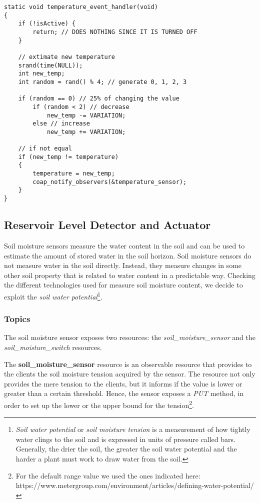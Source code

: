 \begin{lstlisting}
static void temperature_event_handler(void)
{
    if (!isActive) {
        return; // DOES NOTHING SINCE IT IS TURNED OFF
    }
    
    // extimate new temperature
    srand(time(NULL));
    int new_temp;
    int random = rand() % 4; // generate 0, 1, 2, 3
    
    if (random == 0) // 25% of changing the value
        if (random < 2) // decrease
            new_temp -= VARIATION;
        else // increase
            new_temp += VARIATION;

    // if not equal
    if (new_temp != temperature)
    {
        temperature = new_temp;
        coap_notify_observers(&temperature_sensor);
    }
}
\end{lstlisting}



\subsection{Reservoir Level Detector and Actuator}
Soil moisture sensors measure the water content in the soil and can be used to estimate the amount of stored water in the soil horizon. Soil moisture sensors do not measure water in the soil directly. Instead, they measure changes in some other soil property that is related to water content in a predictable way. Checking the different technologies used for measure soil moisture content, we decide to exploit the \textit{soil water potential}\footnote{\textit{Soil water potential} or \textit{soil moisture tension} is a measurement of how tightly water clings to the soil and is expressed in units of pressure called bars. Generally, the drier the soil, the greater the soil water potential and the harder a plant must work to draw water from the soil.}.

\subsubsection{Topics}
The soil moisture sensor exposes two resources: the \textit{soil\_moisture\_sensor} and the \textit{soil\_moisture\_switch} resources.

The \textbf{soil\_moisture\_sensor} resource is an observable resource that provides to the clients the soil moisture tension acquired by the sensor. The resource not only provides the mere tension to the clients, but it informs if the value is lower or greater than a certain threshold. Hence, the sensor exposes a  \textit{PUT} method, in order to set up the lower or the upper bound for the tension\footnote{For the default range value we used the ones indicated here: https://www.metergroup.com/environment/articles/defining-water-potential/ }.

